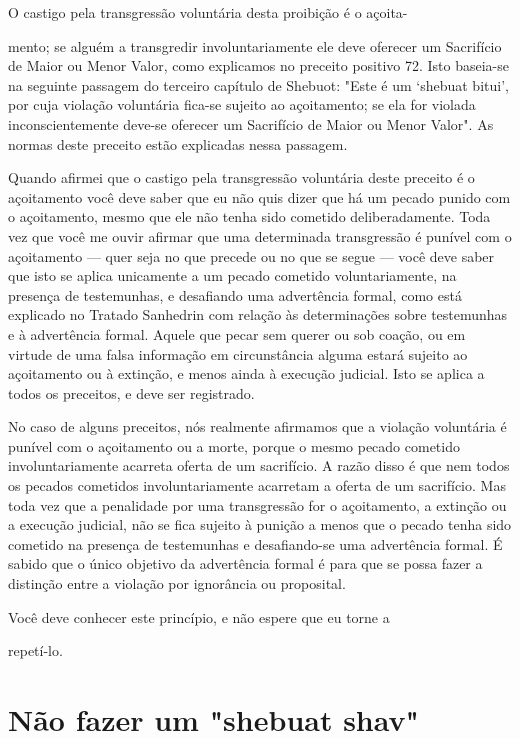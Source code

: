 \begin{itemize}
\begin{enumrate}
\begin{itemize}
\begin{itemize}
\begin{itemize}
O castigo pela transgressão voluntária desta proibição é o açoita-


mento; se alguém a transgredir involuntariamente ele deve oferecer um
Sacrifí­cio de Maior ou Menor Valor, como explicamos no preceito
positivo 72. Isto baseia-se na seguinte passagem do terceiro capítulo de
Shebuot: "Este é um `she­buat bitui', por cuja violação voluntária
fica-se sujeito ao açoitamento; se ela for violada inconscientemente
deve-se oferecer um Sacrifício de Maior ou Me­nor Valor". As normas
deste preceito estão explicadas nessa passagem.

Quando afirmei que o castigo pela transgressão voluntária deste
pre­ceito é o açoitamento você deve saber que eu não quis dizer que há
um pecado punido com o açoitamento, mesmo que ele não tenha sido
cometido delibera­damente. Toda vez que você me ouvir afirmar que uma
determinada transgres­são é punível com o açoitamento --- quer seja no
que precede ou no que se segue --- você deve saber que isto se aplica
unicamente a um pecado cometido voluntariamente, na presença de
testemunhas, e desafiando uma advertência formal, como está explicado no
Tratado Sanhedrin com relação às determina­ções sobre testemunhas e à
advertência formal. Aquele que pecar sem querer ou sob coação, ou em
virtude de uma falsa informação em circunstância algu­ma estará sujeito
ao açoitamento ou à extinção, e menos ainda à execução judi­cial. Isto
se aplica a todos os preceitos, e deve ser registrado.

No caso de alguns preceitos, nós realmente afirmamos que a viola­ção
voluntária é punível com o açoitamento ou a morte, porque o mesmo
pe­cado cometido involuntariamente acarreta oferta de um sacrifício. A
razão dis­so é que nem todos os pecados cometidos involuntariamente
acarretam a ofer­ta de um sacrifício. Mas toda vez que a penalidade por
uma transgressão for o açoitamento, a extinção ou a execução judicial,
não se fica sujeito à punição a menos que o pecado tenha sido cometido
na presença de testemunhas e desafiando-se uma advertência formal. É
sabido que o único objetivo da adver­tência formal é para que se possa
fazer a distinção entre a violação por ignorân­cia ou proposital.


Você deve conhecer este princípio, e não espere que eu torne a


repetí-lo.

\section{Não fazer um "shebuat shav"}


\end{itemize}
\end{itemize}
\end{itemize}
\end{enumrate}
\end{itemize}
